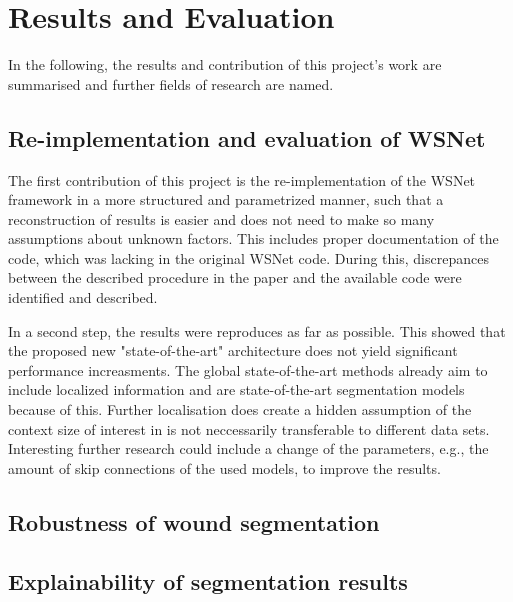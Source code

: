 \section{Results and Evaluation}

In the following, the results and contribution of this project's work are summarised and further fields of research are named.

\subsection{Re-implementation and evaluation of WSNet}

The first contribution of this project is the re-implementation of the WSNet framework in a more structured and parametrized manner, such that a reconstruction of results is easier and does not need to make so many assumptions about unknown factors. This includes proper documentation of the code, which was lacking in the original WSNet code. During this, discrepances between the described procedure in the paper and the available code were identified and described.

In a second step, the results were reproduces as far as possible. This showed that the proposed new "state-of-the-art" architecture does not yield significant performance increasments. The global state-of-the-art methods already aim to include localized information and are state-of-the-art segmentation models because of this. Further localisation does create a hidden assumption of the context size of interest in is not neccessarily transferable to different data sets. Interesting further research could include a change of the parameters, e.g., the amount of skip connections of the used models, to improve the results.

\subsection{Robustness of wound segmentation}



\subsection{Explainability of segmentation results}